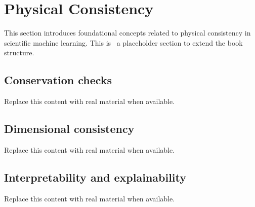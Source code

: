 \section{Physical Consistency}
This section introduces foundational concepts related to physical consistency in scientific machine learning. This is~\cite{abdulmaksoudTransformerBasedSensorFusion2025} a placeholder section to extend the book structure.

\subsection{Conservation checks}
Replace this content with real material when available.

\subsection{Dimensional consistency}
Replace this content with real material when available.

\subsection{Interpretability and explainability}
Replace this content with real material when available.
